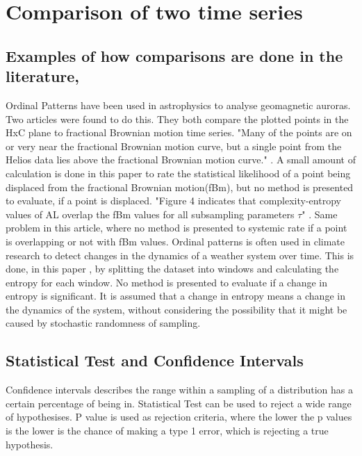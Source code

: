 \chapter{Comparison of two time series}
\section{Examples of how comparisons are done in the literature,}
Ordinal Patterns have been used in astrophysics to analyse geomagnetic auroras. Two articles were found to do this. They both compare the plotted points in the HxC plane to fractional Brownian motion time series. "Many of the points are on or very near the fractional Brownian motion curve, but a single point from the Helios data lies above the fractional Brownian motion curve." \cite{Weygand2019}. A small amount of calculation is done in this paper to rate the statistical likelihood of a point being displaced from the fractional Brownian motion(fBm), but no method is presented to evaluate, if a point is displaced. "Figure 4 indicates that complexity-entropy values of AL overlap the fBm values for all subsampling parameters $\tau$" \cite{Osmane2019}. Same problem in this article, where no method is presented to systemic rate if a point is overlapping or not with fBm values. Ordinal patterns is often used in climate research to detect changes in the dynamics of a weather system over time. This is done, in this paper \cite{Saco2010}, by splitting the dataset into windows and calculating the entropy for each window. No method is presented to evaluate if a change in entropy is significant. It is assumed that a change in entropy means a change in the dynamics of the system, without considering the possibility that it might be caused by stochastic randomness of sampling. 

\section{Statistical Test and Confidence Intervals}
Confidence intervals describes the range within a sampling of a distribution has a certain percentage of being in. Statistical Test can be used to reject a wide range of hypothesises. P value is used as rejection criteria, where the lower the p values is the lower is the chance of making a type 1 error, which is rejecting a true hypothesis.\cite{Smithson2003}

